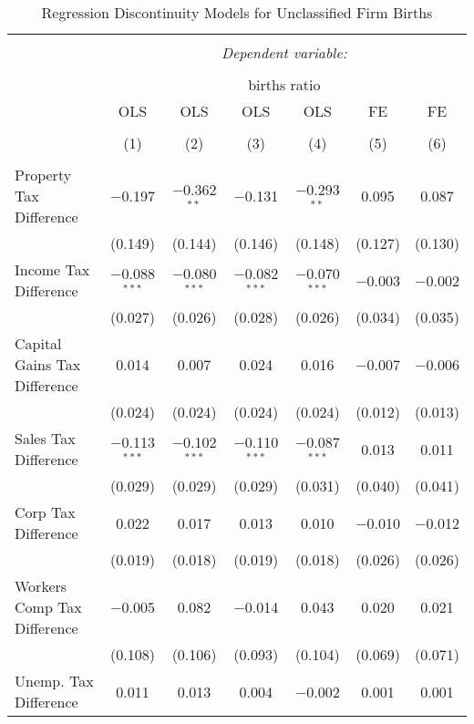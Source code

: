 
\begin{table}[!htbp] \centering 
  \caption{Regression Discontinuity Models for  Unclassified Firm Births} 
  \label{99rd} 
\begin{tabular}{@{\extracolsep{5pt}}lcccccc} 
\\[-1.8ex]\hline 
\hline \\[-1.8ex] 
 & \multicolumn{6}{c}{\textit{Dependent variable:}} \\ 
\cline{2-7} 
\\[-1.8ex] & \multicolumn{6}{c}{births ratio} \\ 
 & OLS & OLS & OLS & OLS & FE & FE \\ 
\\[-1.8ex] & (1) & (2) & (3) & (4) & (5) & (6)\\ 
\hline \\[-1.8ex] 
 Property Tax Difference & $-$0.197 & $-$0.362$^{**}$ & $-$0.131 & $-$0.293$^{**}$ & 0.095 & 0.087 \\ 
  & (0.149) & (0.144) & (0.146) & (0.148) & (0.127) & (0.130) \\ 
  Income Tax Difference & $-$0.088$^{***}$ & $-$0.080$^{***}$ & $-$0.082$^{***}$ & $-$0.070$^{***}$ & $-$0.003 & $-$0.002 \\ 
  & (0.027) & (0.026) & (0.028) & (0.026) & (0.034) & (0.035) \\ 
  Capital Gains Tax Difference & 0.014 & 0.007 & 0.024 & 0.016 & $-$0.007 & $-$0.006 \\ 
  & (0.024) & (0.024) & (0.024) & (0.024) & (0.012) & (0.013) \\ 
  Sales Tax Difference & $-$0.113$^{***}$ & $-$0.102$^{***}$ & $-$0.110$^{***}$ & $-$0.087$^{***}$ & 0.013 & 0.011 \\ 
  & (0.029) & (0.029) & (0.029) & (0.031) & (0.040) & (0.041) \\ 
  Corp Tax Difference & 0.022 & 0.017 & 0.013 & 0.010 & $-$0.010 & $-$0.012 \\ 
  & (0.019) & (0.018) & (0.019) & (0.018) & (0.026) & (0.026) \\ 
  Workers Comp Tax Difference & $-$0.005 & 0.082 & $-$0.014 & 0.043 & 0.020 & 0.021 \\ 
  & (0.108) & (0.106) & (0.093) & (0.104) & (0.069) & (0.071) \\ 
  Unemp. Tax Difference & 0.011 & 0.013 & 0.004 & $-$0.002 & 0.001 & 0.001 \\ 

\end{tabular}
\end{table}
